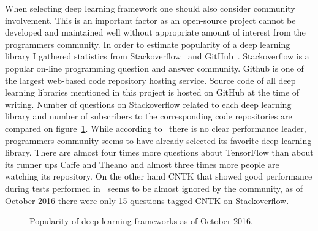 \documentclass[a4paper, 11pt, table]{article}
\begin{document}
When selecting deep learning framework one should also consider community involvement. This is an important factor as an open-source project cannot be developed and maintained well without appropriate amount of interest from the programmers community. In order to estimate popularity of a deep learning library I gathered statistics from Stackoverflow~\cite{Mamykina:2011:DLF:1978942.1979366} and GitHub~\cite{Thung:2013:NSS:2495256.2495709}. Stackoverflow is a popular on-line programming question and answer community. Github is one of the largest web-based code repository hosting service. Source code of all deep learning libraries mentioned in this project is hosted on GitHub at the time of writing. Number of questions on Stackoverflow related to each deep learning library and number of subscribers to the corresponding code repositories are compared on figure~\ref{fig:framework_popularity}. While according to~\cite{DBLP:journals/corr/ShiWXC16} there is no clear performance leader, programmers community seems to have already selected its favorite deep learning library. There are almost four times more questions about TensorFlow than about its runner ups Caffe and Theano and almost three times more people are watching its repository. On the other hand CNTK that showed good performance during tests performed in~\cite{DBLP:journals/corr/ShiWXC16} seems to be almost ignored by the community, as of October 2016 there were only 15 questions tagged CNTK on Stackoverflow. 

\begin{figure}[H]
\centering


\caption{\label{fig:framework_popularity}Popularity of deep learning frameworks as of October 2016.}
\end{figure}
\end{document}
